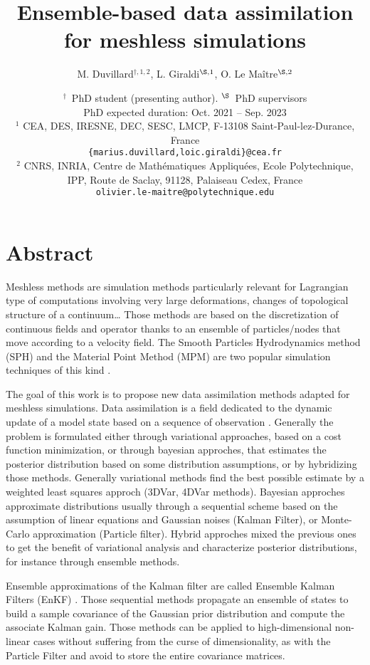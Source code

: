 \documentclass[a4paper,10pt,oneside]{article}
\title{%
  Ensemble-based data assimilation for meshless simulations}
\author{%
  M. Duvillard${}^{\dagger,1,2}$, %
  L. Giraldi${}^{\S,1}$, %
  O. Le Maître${}^{\S,2}$}%
\date{\medskip%
  \small %
  ${}^\dagger$\ PhD student (presenting author). \quad ${}^{\S}$\ PhD supervisors\\[5pt]
  PhD expected duration: {Oct. 2021 -- Sep. 2023}\\[15pt]
  ${}^1$  CEA, DES, IRESNE, DEC, SESC, LMCP, F-13108 Saint-Paul-lez-Durance, France\\
  \texttt{\{marius.duvillard,loic.giraldi\}@cea.fr}\\[4pt]
  ${}^2$ CNRS, INRIA, Centre de Mathématiques Appliquées, Ecole Polytechnique, IPP, Route de Saclay, 91128, Palaiseau Cedex, France\\
  \texttt{olivier.le-maitre@polytechnique.edu}}
\begin{document}
\maketitle

\thispagestyle{fancy}

\section*{Abstract}

Meshless methods are simulation methods particularly relevant for Lagrangian type of computations involving very large deformations, changes of topological structure of a continuum\dots
Those methods are based on the discretization of continuous fields and operator thanks to an ensemble of particles/nodes that move according to a velocity field. The Smooth Particles Hydrodynamics method (SPH) and the Material Point Method (MPM) are two popular simulation techniques of this kind \cite{de_vaucorbeil_material_2020,zhang_smoothed_2022}.

The goal of this work is to propose new data assimilation methods adapted for meshless simulations. Data assimilation is a field dedicated to the dynamic update of a model state based on a sequence of observation \cite{asch_data_2016,evensen_data_2022}. Generally the problem is formulated either through variational approaches, based on a cost function minimization, or through bayesian approches, that estimates the posterior distribution based on some distribution assumptions, or by hybridizing those methods.
Generally variational methods find the best possible estimate by a weighted least squares approch (3DVar, 4DVar methods). Bayesian approches approximate distributions usually through a sequential scheme based on the assumption of linear equations and Gaussian noises (Kalman Filter), or Monte-Carlo approximation (Particle filter). Hybrid approches mixed the previous ones to get the benefit of variational analysis and characterize posterior distributions, for instance through ensemble methods.

Ensemble approximations of the Kalman filter are called Ensemble Kalman Filters (EnKF) \cite{evensen_sequential_1994}. Those sequential methods propagate an ensemble of states to build a sample covariance of the Gaussian prior distribution and compute the associate Kalman gain. Those methods can be applied to high-dimensional non-linear cases without suffering from the curse of dimensionality, as with the Particle Filter and avoid to store the entire covariance matrices.
\end{document}
